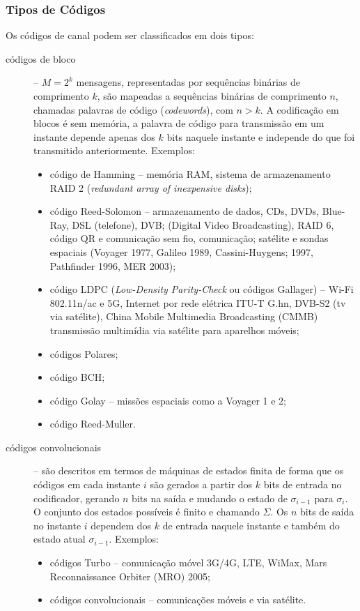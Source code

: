 \begin{frame}[allowframebreaks]
  \frametitle{Tipos de Códigos}
  Os códigos de canal podem ser classificados em dois tipos:
  \begin{description}
    \item[códigos de bloco] -- $M=2^k$ mensagens, representadas por sequências binárias de comprimento $k$,
      são mapeadas a sequências binárias de comprimento $n$, chamadas palavras de código (\emph{codewords}), com
      $n > k$. A codificação em blocos é sem memória, a palavra de código para transmissão em um instante depende
      apenas dos $k$ bits naquele instante e independe do que foi transmitido anteriormente. Exemplos:
      \begin{itemize}
      \item código de Hamming -- memória RAM, sistema de armazenamento RAID 2 (\emph{redundant array of inexpensive disks});
      \item código Reed-Solomon  -- armazenamento de dados, CDs, DVDs, Blue-Ray, DSL (telefone), DVB; (Digital Video Broadcasting), RAID 6, código QR  e comunicação sem fio, comunicação;
satélite e sondas espaciais (Voyager 1977, Galileo 1989, Cassini-Huygens; 1997, Pathﬁnder 1996, MER 2003);
      \item código LDPC (\emph{Low-Density Parity-Check} ou códigos Gallager) -- Wi-Fi 802.11n/ac e 5G, Internet por rede elétrica ITU-T G.hn, DVB-S2 (tv via satélite), China Mobile Multimedia Broadcasting (CMMB) transmissão multimídia via satélite para aparelhos móveis;
      \item códigos Polares;
      \item código BCH;
      \item código Golay  -- missões espaciais como a Voyager 1 e 2;
      \item código Reed-Muller.
      \end{itemize}

    \item[códigos convolucionais] -- são descritos em termos de máquinas de estados finita de forma que os códigos em cada instante $i$ são gerados a
      partir dos $k$ bits de entrada no codificador, gerando $n$ bits na saída e mudando o estado de $\sigma_{i-1}$ para $\sigma_i$. O conjunto dos
      estados possíveis é finito e chamando $\Sigma$. Os $n$ bits de saída no instante $i$ dependem dos $k$ de entrada naquele instante e também
      do estado atual $\sigma_{i-1}$. Exemplos:
      \begin{itemize}
        \item códigos Turbo -- comunicação móvel 3G/4G, LTE, WiMax, Mars Reconnaissance Orbiter (MRO) 2005;
        \item códigos convolucionais -- comunicações móveis e via satélite.
      \end{itemize}
  \end{description}
\end{frame}

